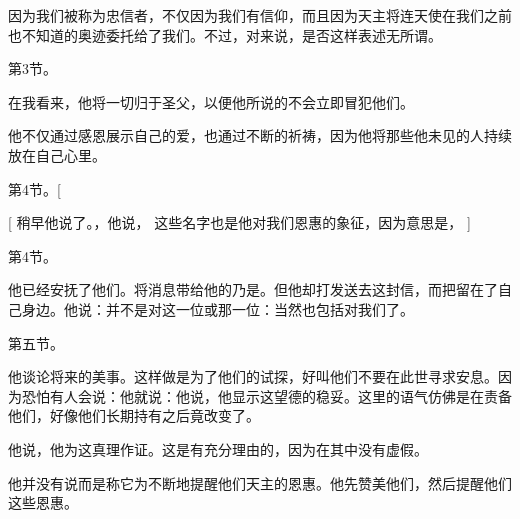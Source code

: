 因为我们被称为忠信者，不仅因为我们有信仰，而且因为天主将连天使在我们之前也不知道的奥迹委托给了我们。不过，对来说，是否这样表述无所谓。\par

第3节。 \par

在我看来，他将一切归于圣父，以便他所说的不会立即冒犯他们。\par

\par

他不仅通过感恩展示自己的爱，也通过不断的祈祷，因为他将那些他未见的人持续放在自己心里。\par

第4节。[  \par

[ 稍早他说了。，他说，  这些名字也是他对我们恩惠的象征，因为意思是，  ]\par

第4节。 \par

他已经安抚了他们。将消息带给他的乃是。但他却打发送去这封信，而把留在了自己身边。他说：并不是对这一位或那一位：当然也包括对我们了。\par

第五节。 \par

他谈论将来的美事。这样做是为了他们的试探，好叫他们不要在此世寻求安息。因为恐怕有人会说：他就说：他说，他显示这望德的稳妥。这里的语气仿佛是在责备他们，好像他们长期持有之后竟改变了。\par

他说，他为这真理作证。这是有充分理由的，因为在其中没有虚假。\par

他并没有说而是称它为不断地提醒他们天主的恩惠。他先赞美他们，然后提醒他们这些恩惠。\par


